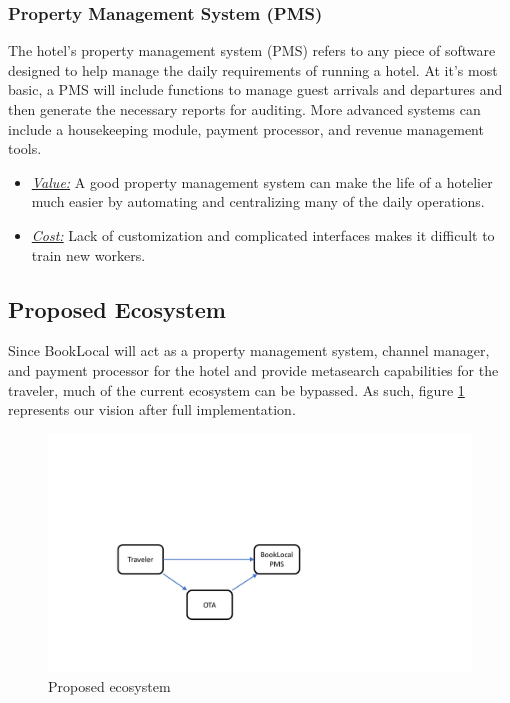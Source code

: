 \documentclass{article}
\begin{document}
\subsubsection{Property Management System (PMS)}
The hotel's property management system (PMS) refers to any piece of software designed to help manage the daily requirements of running a hotel. At it's most basic, a PMS will include functions to manage guest arrivals and departures and then generate the necessary reports for auditing. More advanced systems can include a housekeeping module, payment processor, and revenue management tools. 
\begin{itemize}
 \item \underline{\textit{Value:}} A good property management system can make the life of a hotelier much easier by automating and centralizing many of the daily operations. 
  \item \underline{\textit{Cost:}} Lack of customization and complicated interfaces makes it difficult to train new workers. 
  \end{itemize}

\newpage

\subsection{Proposed Ecosystem}
Since BookLocal will act as a property management system, channel manager, and payment processor for the hotel and provide metasearch capabilities for the traveler, much of the current ecosystem can be bypassed. As such, figure \ref{bl} represents our vision after full implementation. 

\begin{figure}[H]
\centering
\includegraphics[width = .9\textwidth]{bookLocal_Ecosystem.pdf}
\caption{Proposed ecosystem}
\label{bl}
\end{figure}
\end{document}
